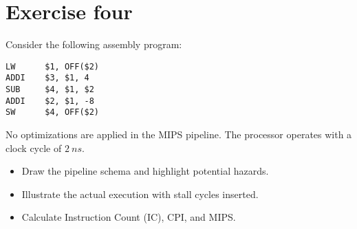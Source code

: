 \section{Exercise four}

Consider the following assembly program: 
\begin{verbatim}
LW      $1, OFF($2)
ADDI    $3, $1, 4
SUB     $4, $1, $2
ADDI    $2, $1, -8
SW      $4, OFF($2)
\end{verbatim}
No optimizations are applied in the MIPS pipeline. 
The processor operates with a clock cycle of $2\:ns$. 
\begin{itemize}
    \item Draw the pipeline schema and highlight potential hazards.
    \item Illustrate the actual execution with stall cycles inserted.
    \item Calculate Instruction Count (IC), CPI, and MIPS.
\end{itemize}

